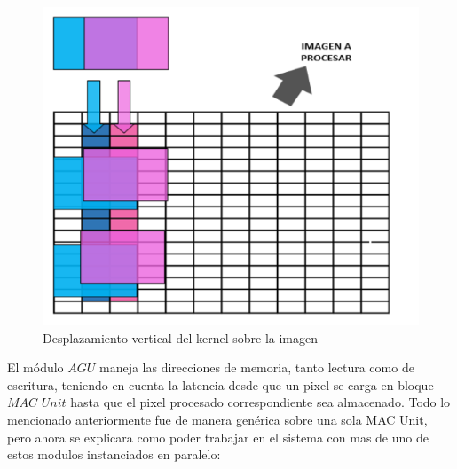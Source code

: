 \begin{figure}
\centering
\includegraphics[scale=0.7]{conv1_despl.png}
\caption{Desplazamiento vertical del kernel sobre la imagen }
\label{verticaldesp}
\end{figure}


El módulo $AGU$ maneja las direcciones de memoria, tanto lectura como de escritura, teniendo en cuenta la latencia desde que un pixel se carga en bloque $MAC$ $Unit$ hasta que el pixel procesado correspondiente sea almacenado.
Todo lo mencionado anteriormente fue de manera genérica sobre una sola MAC Unit, pero ahora se explicara como poder trabajar en el sistema con mas de uno de estos modulos instanciados en paralelo:

